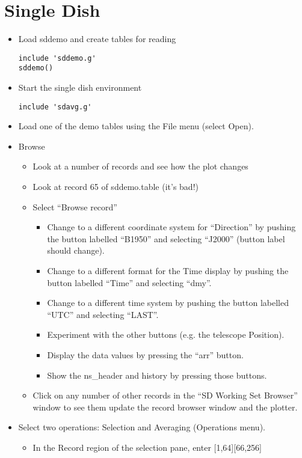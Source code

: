 \section{Single Dish}

\begin{itemize}
\item Load sddemo and create tables for reading
\begin{verbatim}
include 'sddemo.g'
sddemo()
\end{verbatim}
\item Start the single dish environment
\begin{verbatim}
include 'sdavg.g'
\end{verbatim}
\item Load one of the demo tables using the File menu (select Open).
\item Browse
\begin{itemize}
\item Look at a number of records and see how the plot changes
\item Look at record 65 of sddemo.table (it's bad!)
\item Select ``Browse record''
\begin{itemize}
\item Change to a different coordinate system for ``Direction'' by pushing
the button labelled ``B1950'' and selecting ``J2000'' (button label should
change).
\item Change to a different format for the Time display by pushing the
button labelled ``Time'' and selecting ``dmy''.
\item Change to a different time system by pushing the button labelled
``UTC'' and selecting ``LAST''.
\item Experiment with the other buttons (e.g. the telescope Position).
\item Display the data values by pressing the ``arr'' button.
\item Show the ns\_header and history by pressing those buttons.
\end{itemize}
\item Click on any number of other records in the ``SD Working Set Browser''
window to see them update the record browser window and the plotter.
\end{itemize}
\item Select two operations: Selection and Averaging (Operations menu).
\begin{itemize}
\item In the Record region of the selection pane, enter [1,64][66,256]

\end{itemize}
\end{itemize}
